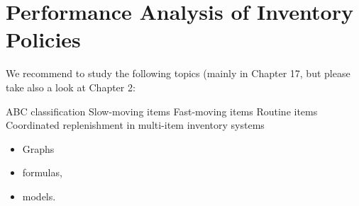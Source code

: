 \section{Performance Analysis of Inventory Policies}

We recommend to study the following topics (mainly in Chapter 17, but please take also a look at Chapter 2:

ABC classification
Slow-moving items
Fast-moving items
Routine items
Coordinated replenishment in multi-item inventory systems

\begin{itemize}
\item Graphs
\item formulas,
\item models.
\end{itemize}

